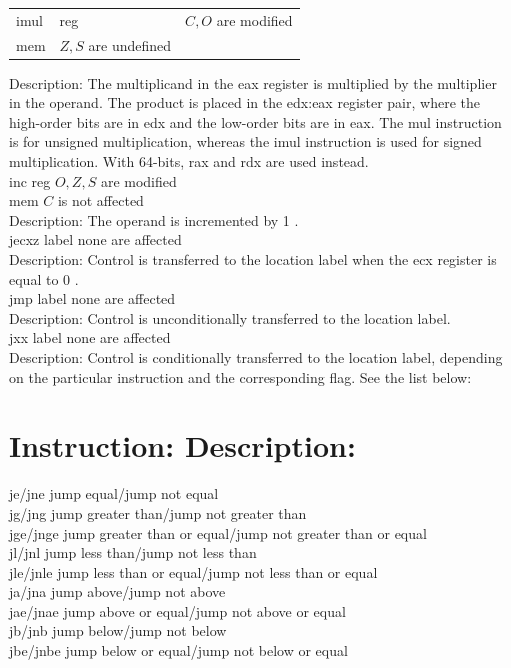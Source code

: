 \documentclass[10pt]{article}
\begin{document}
\begin{center}
\begin{tabular}{lll}
imul & reg & $C, O$ are modified \\
mem & $Z, S$ are undefined &  \\
\end{tabular}
\end{center}

Description: The multiplicand in the eax register is multiplied by the multiplier in the operand. The product is placed in the edx:eax register pair, where the high-order bits are in edx and the low-order bits are in eax. The mul instruction is for unsigned multiplication, whereas the imul instruction is used for signed multiplication. With 64-bits, rax and rdx are used instead.\\
inc reg $O, Z, S$ are modified\\
mem $C$ is not affected\\
Description: The operand is incremented by 1 .\\
jecxz label none are affected\\
Description: Control is transferred to the location label when the ecx register is equal to 0 .\\
jmp label none are affected\\
Description: Control is unconditionally transferred to the location label.\\
jxx label none are affected\\
Description: Control is conditionally transferred to the location label, depending on the particular instruction and the corresponding flag. See the list below:

\section*{Instruction: Description:}
je/jne jump equal/jump not equal\\
jg/jng jump greater than/jump not greater than\\
jge/jnge jump greater than or equal/jump not greater than or equal\\
jl/jnl jump less than/jump not less than\\
jle/jnle jump less than or equal/jump not less than or equal\\
ja/jna jump above/jump not above\\
jae/jnae jump above or equal/jump not above or equal\\
jb/jnb jump below/jump not below\\
jbe/jnbe jump below or equal/jump not below or equal
\end{document}
